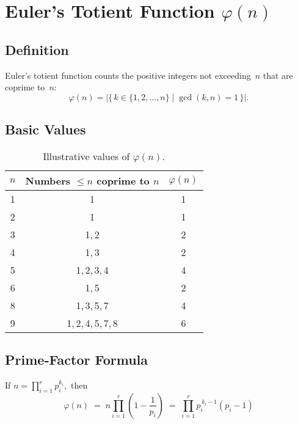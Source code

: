 \documentclass[12pt]{article}
\title{}
\author{Jerich Lee}
\date{\today}
\theoremstyle{definition} %
\theoremstyle{plain} %
\begin{document}
\maketitle
\section{Euler’s Totient Function \texorpdfstring{$\varphi(n)$}{phi(n)}}

\subsection{Definition}
Euler’s totient function counts the positive integers not exceeding~$n$
that are coprime to~$n$:
\[
  \varphi(n)=\bigl|\{\,k\in\{1,2,\dots ,n\}\mid\gcd(k,n)=1\,\}\bigr|.
\]

\subsection{Basic Values}
\begin{table}[h]
  \centering
  \small
  \setlength\tabcolsep{10pt}
  \renewcommand{\arraystretch}{1.1}
  \begin{tabular}{ccc}
    \toprule
    $n$ & Numbers $\le n$ coprime to $n$              & $\varphi(n)$ \\ \midrule
    1   & 1                                           & 1 \\
    2   & 1                                           & 1 \\
    3   & 1,\,2                                       & 2 \\
    4   & 1,\,3                                       & 2 \\
    5   & 1,\,2,\,3,\,4                               & 4 \\
    6   & 1,\,5                                       & 2 \\
    8   & 1,\,3,\,5,\,7                               & 4 \\
    9   & 1,\,2,\,4,\,5,\,7,\,8                       & 6 \\
    \bottomrule
  \end{tabular}
  \caption{Illustrative values of $\varphi(n)$.}
\end{table}

\subsection{Prime‑Factor Formula}
If 
\(
  n=\displaystyle\prod_{i=1}^r p_i^{k_i},
\)
then
\[
  \boxed{\;
    \varphi(n)\;=\;
      n\prod_{i=1}^r\!\left(1-\frac1{p_i}\right)
      \;=\;
      \prod_{i=1}^r p_i^{\,k_i-1}(p_i-1)
  \;}
\]
\end{document}
